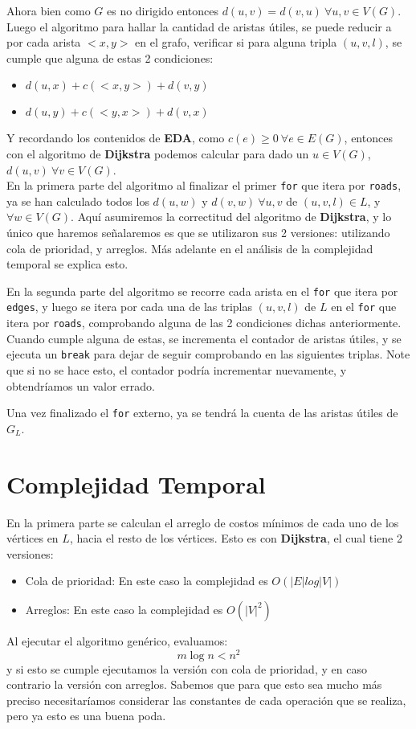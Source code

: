 \documentclass[a4paper]{article}
\begin{document}
	
	Ahora bien como $G$ es no dirigido entonces $d(u,v) = d(v,u) ~ \forall u,v\in V(G)$.\\
	
	Luego el algoritmo para hallar la cantidad de aristas útiles, se puede reducir a por cada arista $<x,y>$ en el grafo, verificar si para alguna tripla $(u,v,l)$, se cumple que alguna de estas 2 condiciones:	
	\begin{itemize}
		\item $d(u,x) + c(<x,y>) + d(v, y)$
		\item $d(u,y) + c(<y,x>) + d(v, x)$
	\end{itemize}

	Y recordando los contenidos de \textbf{EDA}, como $c(e) \ge 0 ~ \forall e \in E(G)$, entonces con el algoritmo de \textbf{Dijkstra} podemos calcular para dado un $u\in V(G)$, $d(u,v) ~ \forall v \in V(G)$.\\
   
	
	En la primera parte del algoritmo al finalizar el primer \texttt{for} que itera por \texttt{roads}, ya se han calculado todos los $d(u, w)$ y $d(v, w) ~ \forall u,v$ de $(u,v,l) \in L$, y $\forall w \in V(G)$. Aquí asumiremos la correctitud del algoritmo de \textbf{Dijkstra}, y lo único que haremos señalaremos es que se utilizaron sus 2 versiones: utilizando cola de prioridad, y arreglos. Más adelante en el análisis de la complejidad temporal se explica esto.
	
	En la segunda parte del algoritmo se recorre cada arista en el \texttt{for} que itera por \texttt{edges}, y luego se itera por cada una de las triplas $(u,v,l)$ de $L$ en el \texttt{for} que itera por \texttt{roads}, comprobando alguna de las 2 condiciones dichas anteriormente. Cuando cumple alguna de estas, se incrementa el contador de aristas útiles, y se ejecuta un \texttt{break} para dejar de seguir comprobando en las siguientes triplas. Note que si no se hace esto, el contador podría incrementar nuevamente, y obtendríamos un valor errado.
	
	Una vez finalizado el \texttt{for} externo, ya se tendrá la cuenta de las aristas útiles de $G_L$.
	

	\section*{Complejidad Temporal}
	
	En la primera parte se calculan el arreglo de costos mínimos de cada uno de los vértices en $L$, hacia el resto de los vértices. Esto es con \textbf{Dijkstra}, el cual tiene 2 versiones:
	\begin{itemize}
		\item Cola de prioridad: En este caso la complejidad es $O(|E|log|V|)$
		\item Arreglos: En este caso la complejidad es $O(|V|^2)$
	\end{itemize}
	Al ejecutar el algoritmo genérico, evaluamos:
	$$ m\log n < n^2$$
	y si esto se cumple ejecutamos la versión con cola de prioridad, y en caso contrario la versión con arreglos. Sabemos que para que esto sea mucho más preciso necesitaríamos considerar las constantes de cada operación que se realiza, pero ya esto es una buena poda.
	
\end{document}
